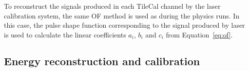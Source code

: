 To reconstruct the signals produced in each TileCal channel by the laser calibration system, the same OF method is used as during the physics runs. 
In this case, the pulse shape function corresponding to the signal produced by laser is used to calculate the linear coefficients $a_i$, $b_i$ and $c_i$ from Equation~\eqref{eq:of}. 

%
%
%
%

\subsection{Energy reconstruction and calibration}

